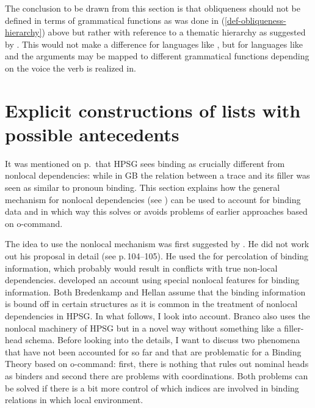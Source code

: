 \documentclass[output=paper
 	        ,biblatex
                ,babelshorthands
                ,newtxmath
                ,draftmode
                ,colorlinks, citecolor=brown
]{langscibook}
\begin{document}
The conclusion to be drawn from this section is that obliqueness should not be defined in terms of
grammatical functions as was done in (\ref{def-obliqueness-hierarchy}) above but rather with
reference to a thematic hierarchy as suggested by \citet{Jackendoff72a-u}. 
This would not make a difference for languages like , but for languages like
 and  the arguments may be mapped to different grammatical functions
depending on the voice the verb is realized in. 





\section{Explicit constructions of lists with possible antecedents}
\label{sec-bt-nonlocal}

It was mentioned on p.\,\pageref{page-traces-binding} that HPSG sees binding as crucially different from nonlocal
dependencies: while in GB the relation between a trace and its filler was seen as similar to pronoun
binding. This section explains how the general mechanism for nonlocal dependencies (see
) can be used to account for binding data and in which way this solves or
avoids problems of earlier approaches based on o-command. 

The idea to use the nonlocal mechanism was first suggested by
\citet[Section~7.2.3]{Bredenkamp96a}. He did not work out his proposal in detail (see 
p.\,104--105). He used the \slashf for percolation of binding information, which probably would
result in conflicts with true non-local dependencies. \citet{Hellan2005a} developed an account using
special nonlocal features for binding information. Both Bredenkamp and Hellan assume that the
binding information is bound off in certain structures as it is common in the treatment of nonlocal
dependencies in HPSG. In what follows, I look into  account. Branco also
uses the nonlocal machinery of HPSG but in a novel way without something like a filler-head
schema. Before looking into the details, I want to discuss two phenomena that have not been
accounted for so far and that are problematic for a Binding Theory based on o-command: first, there
is nothing that rules out nominal heads as binders and second there are problems with
coordinations. Both problems can be solved if there is a bit more control of which indices are
involved in binding relations in which local environment.
\end{document}
